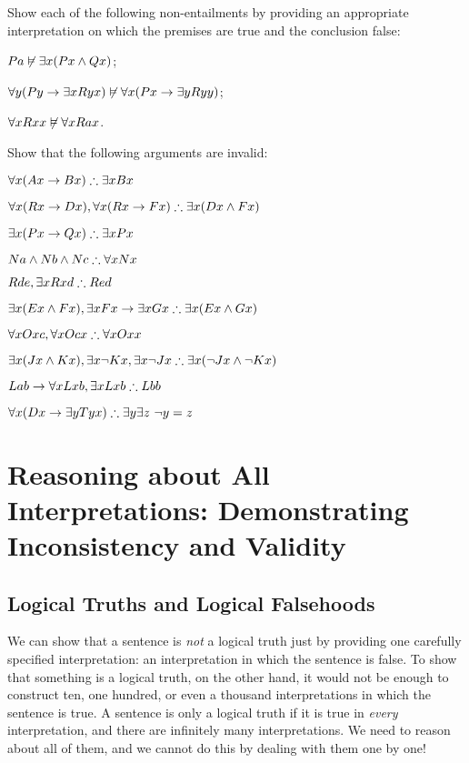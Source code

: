 \begin{earg}
\problempart Show each of the following non-entailments by providing an appropriate interpretation on which the premises are true and the conclusion false: \begin{earg}
\item $Pa\not\vDash\exists x(Px\wedge Qx)$;
\item  $\forall y(Py\rightarrow \exists x Ryx)\not\vDash\forall x(Px\rightarrow \exists yRyy)$;
\item  $\forall x Rxx\not\vDash\forall x Rax$.
\end{earg}


\problempart
Show that the following arguments are invalid:
\begin{earg}
\item $\forall x(Ax \rightarrow Bx) \mathrel{\therefore} \exists x Bx$
\item $\forall x(Rx \rightarrow Dx), \forall x(Rx \rightarrow Fx) \mathrel{\therefore} \exists x(Dx \wedge Fx)$
\item $\exists x(Px\rightarrow Qx) \mathrel{\therefore} \exists x Px$
\item $Na \wedge Nb \wedge Nc \mathrel{\therefore} \forall x Nx$
\item $Rde, \exists x Rxd \mathrel{\therefore} Red$
\item $\exists x(Ex \wedge Fx), \exists x Fx \rightarrow \exists x Gx \mathrel{\therefore} \exists x(Ex \wedge Gx)$
\item $\forall x Oxc, \forall x Ocx \mathrel{\therefore} \forall x Oxx$
\item $\exists x(Jx \wedge Kx), \exists x \neg Kx, \exists x \neg Jx \mathrel{\therefore} \exists x(\neg Jx \wedge \neg Kx)$
\item $Lab \rightarrow \forall x Lxb, \exists x Lxb \mathrel{\therefore} Lbb$
\item $\forall x(Dx \rightarrow \exists y Tyx) \mathrel{\therefore} \exists y \exists z\ \neg y= z$
\end{earg}

\chapter[Reasoning about All Interpretations]{Reasoning about All Interpretations: Demonstrating Inconsistency and Validity}\label{s:All.Interp}

\section{Logical Truths and Logical Falsehoods}
We can show that a sentence is \emph{not} a logical truth just by providing one carefully specified interpretation: an interpretation in which the sentence is false. To show that something is a logical truth, on the other hand, it would not be enough to construct ten, one hundred, or even a thousand interpretations in which the sentence is true. A sentence is only a logical truth if it is true in \emph{every} interpretation, and there are infinitely many interpretations. We need to reason about all of them, and we cannot do this by dealing with them one by one!


\end{earg}
